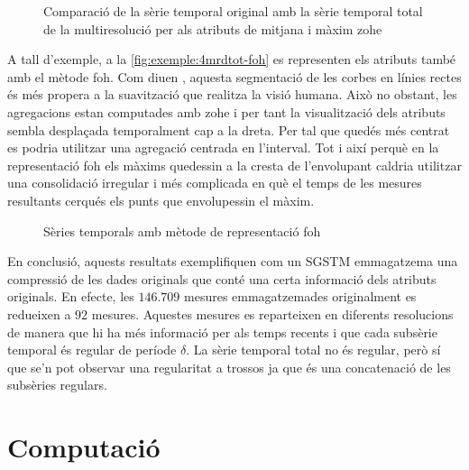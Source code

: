 \begin{figure}[tp]
  \centering
  
  \caption{Comparació de la sèrie temporal original amb la sèrie temporal total de la multiresolució per als atributs de mitjana i màxim \gls{zohe}}
  \label{fig:exemple:4mrdtot}
\end{figure}







A tall d'exemple, a la \autoref{fig:exemple:4mrdtot-foh} es
representen els atributs també amb el mètode \gls{foh}. Com diuen
\textcite{keogh97}, aquesta segmentació de les corbes en línies rectes
és més propera a la suavització que realitza la visió humana.  Això no
obstant, les agregacions estan computades amb \gls{zohe} i per tant la
visualització dels atributs sembla desplaçada temporalment cap a la
dreta. Per tal que quedés més centrat es podria utilitzar una
agregació centrada en l'interval. Tot i així perquè en la
representació \gls{foh} els màxims quedessin a la cresta de
l'envolupant caldria utilitzar una consolidació irregular i més
complicada en què el temps de les mesures resultants cerqués els punts
que envolupessin el màxim.


\begin{figure}[tp]
  \centering
  
  \caption{Sèries temporals amb mètode de representació \gls{foh}}
  \label{fig:exemple:4mrdtot-foh}
\end{figure}



En conclusió, aquests resultats exemplifiquen com un \gls{SGSTM}
emmagatzema una compressió de les dades originals que conté una certa
informació dels atributs originals. En efecte, les $146.709$ mesures
emmagatzemades originalment es redueixen a $92$ mesures. Aquestes
mesures es reparteixen en diferents resolucions de manera que hi ha
més informació per als temps recents i que cada subsèrie temporal és
regular de període $\delta$. La sèrie temporal total no és regular,
però sí que se'n pot observar una regularitat a trossos ja que és una
concatenació de les subsèries regulars.




\section{Computació}



